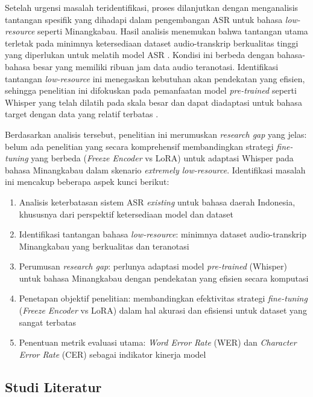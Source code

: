 Setelah urgensi masalah teridentifikasi, proses dilanjutkan dengan menganalisis tantangan spesifik yang dihadapi dalam pengembangan ASR untuk bahasa \textit{low-resource} seperti Minangkabau. Hasil analisis menemukan bahwa tantangan utama terletak pada minimnya ketersediaan dataset audio-transkrip berkualitas tinggi yang diperlukan untuk melatih model ASR \cite{liu2024exploration,timmel2024finetune}. Kondisi ini berbeda dengan bahasa-bahasa besar yang memiliki ribuan jam data audio teranotasi. Identifikasi tantangan \textit{low-resource} ini menegaskan kebutuhan akan pendekatan yang efisien, sehingga penelitian ini difokuskan pada pemanfaatan model \textit{pre-trained} seperti Whisper yang telah dilatih pada skala besar dan dapat diadaptasi untuk bahasa target dengan data yang relatif terbatas \cite{radford2023whisper}.

Berdasarkan analisis tersebut, penelitian ini merumuskan \textit{research gap} yang jelas: belum ada penelitian yang secara komprehensif membandingkan strategi \textit{fine-tuning} yang berbeda (\textit{Freeze Encoder} vs LoRA) untuk adaptasi Whisper pada bahasa Minangkabau dalam skenario \textit{extremely low-resource}. Identifikasi masalah ini mencakup beberapa aspek kunci berikut:

\begin{enumerate}[noitemsep]
    \item Analisis keterbatasan sistem ASR \textit{existing} untuk bahasa daerah Indonesia, khususnya dari perspektif ketersediaan model dan dataset
    \item Identifikasi tantangan bahasa \textit{low-resource}: minimnya dataset audio-transkrip Minangkabau yang berkualitas dan teranotasi
    \item Perumusan \textit{research gap}: perlunya adaptasi model \textit{pre-trained} (Whisper) untuk bahasa Minangkabau dengan pendekatan yang efisien secara komputasi
    \item Penetapan objektif penelitian: membandingkan efektivitas strategi \textit{fine-tuning} (\textit{Freeze Encoder} vs LoRA) dalam hal akurasi dan efisiensi untuk dataset yang sangat terbatas
    \item Penentuan metrik evaluasi utama: \textit{Word Error Rate} (WER) dan \textit{Character Error Rate} (CER) sebagai indikator kinerja model
\end{enumerate}

\subsection{Studi Literatur}
\label{III.Langkah2}

